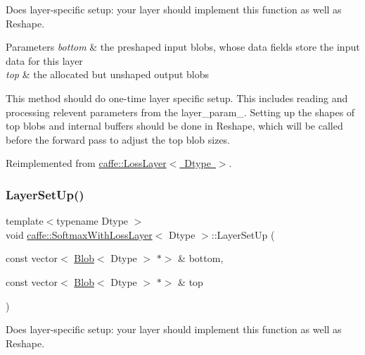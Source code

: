 Does layer-\/specific setup\+: your layer should implement this function as well as Reshape. 


\begin{DoxyParams}{Parameters}
{\em bottom} & the preshaped input blobs, whose data fields store the input data for this layer \\
\hline
{\em top} & the allocated but unshaped output blobs\\
\hline
\end{DoxyParams}
This method should do one-\/time layer specific setup. This includes reading and processing relevent parameters from the {\ttfamily layer\+\_\+param\+\_\+}. Setting up the shapes of top blobs and internal buffers should be done in {\ttfamily Reshape}, which will be called before the forward pass to adjust the top blob sizes. 

Reimplemented from \mbox{\hyperlink{classcaffe_1_1_loss_layer_aa6fc7c2e90be66f1c1f0683637c949da}{caffe\+::\+Loss\+Layer$<$ Dtype $>$}}.

\mbox{\label{classcaffe_1_1_softmax_with_loss_layer_a96cd04896d4b805fcaf36c2c6522ae10}} 
\subsubsection{\texorpdfstring{Layer\+Set\+Up()}{LayerSetUp()}\hspace{0.1cm}{\footnotesize\ttfamily [2/2]}}
{\footnotesize\ttfamily template$<$typename Dtype $>$ \\
void \mbox{\hyperlink{classcaffe_1_1_softmax_with_loss_layer}{caffe\+::\+Softmax\+With\+Loss\+Layer}}$<$ Dtype $>$\+::Layer\+Set\+Up (\begin{DoxyParamCaption}\item[{const vector$<$ \mbox{\hyperlink{classcaffe_1_1_blob}{Blob}}$<$ Dtype $>$ $\ast$$>$ \&}]{bottom,  }\item[{const vector$<$ \mbox{\hyperlink{classcaffe_1_1_blob}{Blob}}$<$ Dtype $>$ $\ast$$>$ \&}]{top }\end{DoxyParamCaption})\hspace{0.3cm}{\ttfamily [virtual]}}



Does layer-\/specific setup\+: your layer should implement this function as well as Reshape. 



